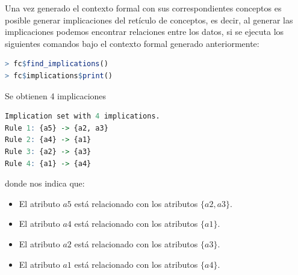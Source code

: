 \documentclass[../../main.tex]{subfiles}
\begin{document}
\vskip 0.2in

Una vez generado el contexto formal con sus correspondientes conceptos es posible generar implicaciones del retículo de conceptos, es decir, al generar las implicaciones podemos encontrar relaciones entre los datos, si se ejecuta los siguientes comandos bajo el contexto formal generado anteriormente:

\vskip 0.2in

\begin{lstlisting}[language=R]
> fc$find_implications()
> fc$implications$print()
\end{lstlisting}

\vskip 0.2in
\newpage
Se obtienen 4 implicaciones

\begin{lstlisting}[language=R]
Implication set with 4 implications.
Rule 1: {a5} -> {a2, a3}
Rule 2: {a4} -> {a1}
Rule 3: {a2} -> {a3}
Rule 4: {a1} -> {a4}
\end{lstlisting}

\vskip 0.2in

donde nos indica que:

\begin{itemize}
    \item El atributo $a5$ está relacionado con los atributos $\{ a2,a3 \}$.
    \item El atributo $a4$ está relacionado con los atributos $\{ a1 \}$.
    \item El atributo $a2$ está relacionado con los atributos $\{ a3 \}$.
    \item El atributo $a1$ está relacionado con los atributos $\{ a4 \}$.
\end{itemize}
\end{document}
